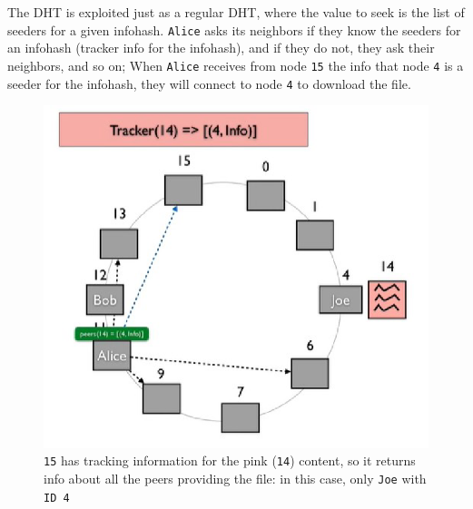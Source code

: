 \begin{paracol}{2}
   \colfill
   The DHT is exploited just as a regular DHT, where the value to seek is the list of seeders for a given infohash.
   \texttt{Alice} asks its neighbors if they know the seeders for an infohash (tracker info for the infohash), and if they do not, they ask their neighbors, and so on;
   When \texttt{Alice} receives from node \texttt{15} the info that node \texttt{4} is a seeder for the infohash, they will connect to node \texttt{4} to download the file.
   \colfill
   \switchcolumn
   \begin{figure}[htbp]
      \centering
      \includegraphics{images/bittorrent_dht.png}
      \caption{\texttt{15} has tracking information for the pink (\texttt{14}) content, so it returns info about all the peers providing the file: in this case, only \texttt{Joe} with \texttt{ID 4}}
      \label{fig:}
   \end{figure}
\end{paracol}
